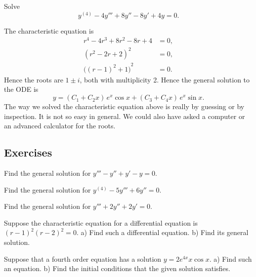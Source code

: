 \begin{example}
Solve
\begin{equation*}
y^{(4)} - 4 y''' + 8 y'' - 8 y' + 4y = 0 .
\end{equation*}

The characteristic equation is
\begin{align*}
r^4 - 4 r^3 + 8 r^2 - 8 r + 4 & = 0 , \\
{(r^2-2r+2)}^2 & = 0 , \\
{\bigl({(r-1)}^2+1\bigr)}^2 & = 0 .
\end{align*}
Hence the roots are $1 \pm i$, both with multiplicity 2.  Hence the general
solution to the ODE is
\begin{equation*}
y = 
( C_1 + C_2 x ) \, e^{x} \cos x
+
( C_3 + C_4 x ) \, e^{x} \sin x .
\end{equation*}
The way we solved the characteristic equation above is really by guessing or
by inspection.  It is not so easy in general.  We could also have asked
a computer or an advanced calculator for the roots.
\end{example}


\subsection{Exercises}

\begin{exercise}
Find the general solution for $y''' - y'' + y' - y = 0$.
\end{exercise}

\begin{exercise}
Find the general solution for $y^{(4)} - 5 y''' + 6 y'' = 0$.
\end{exercise}

\begin{exercise}
Find the general solution for $y''' + 2 y'' + 2 y' = 0$.
\end{exercise}

\begin{exercise}
Suppose the characteristic equation for a differential equation is
${(r-1)}^2{(r-2)}^2 = 0$.  a) Find such a differential equation.
b) Find its general solution.
\end{exercise}

\begin{exercise} \label{hol:eqfromsolex}
Suppose that a fourth order equation has a solution
$y = 2 e^{4x} x \cos x$.  
a) Find such an equation.  b) Find the initial conditions that the given
solution satisfies.
\end{exercise}

